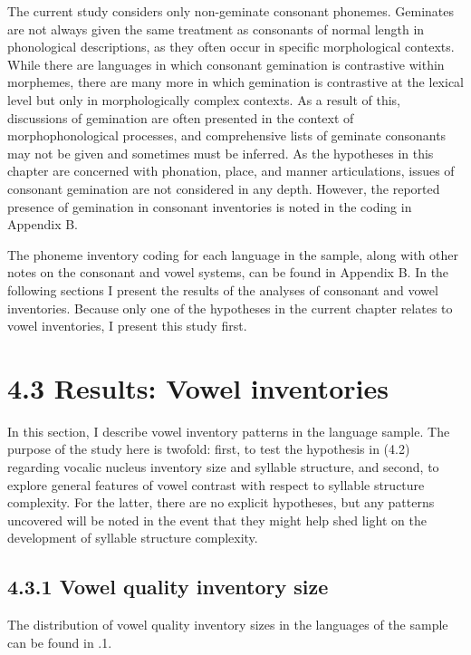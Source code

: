 \z


  The current study considers only non-geminate consonant phonemes. Geminates are not always given the same treatment as consonants of normal length in phonological descriptions, as they often occur in specific morphological contexts. While there are languages in which consonant gemination is contrastive within morphemes, there are many more in which gemination is contrastive at the lexical level but only in morphologically complex contexts. As a result of this, discussions of gemination are often presented in the context of morphophonological processes, and comprehensive lists of geminate consonants may not be given and sometimes must be inferred. As the hypotheses in this chapter are concerned with phonation, place, and manner articulations, issues of consonant gemination are not considered in any depth. However, the reported presence of gemination in consonant inventories is noted in the coding in Appendix B.



  The phoneme inventory coding for each language in the sample, along with other notes on the consonant and vowel systems, can be found in Appendix B. In the following sections I present the results of the analyses of consonant and vowel inventories. Because only one of the hypotheses in the current chapter relates to vowel inventories, I present this study first.


\section{4.3 Results: Vowel inventories}

  In this section, I describe vowel inventory patterns in the language sample. The purpose of the study here is twofold: first, to test the hypothesis in (4.2) regarding vocalic nucleus inventory size and syllable structure, and second, to explore general features of vowel contrast with respect to syllable structure complexity. For the latter, there are no explicit hypotheses, but any patterns uncovered will be noted in the event that they might help shed light on the development of syllable structure complexity.


\subsection{4.3.1 Vowel quality inventory size}

  The distribution of vowel quality inventory sizes in the languages of the sample can be found in .1.





